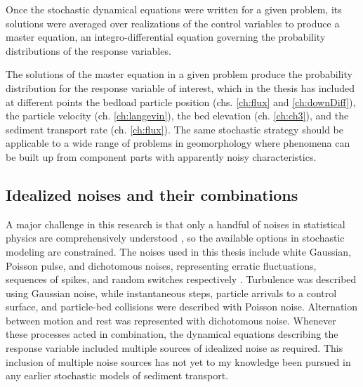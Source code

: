 Once the stochastic dynamical equations were written for a given problem, its solutions were averaged over realizations of the control variables to produce a master equation, an integro-differential equation governing the probability distributions of the response variables.

The solutions of the master equation in a given problem produce the probability distribution for the response variable of interest, which in the thesis has included at different points the bedload particle position (chs. \ref{ch:flux} and \ref{ch:downDiff}), the particle velocity (ch. \ref{ch:langevin}), the bed elevation (ch. \ref{ch:ch3}), and the sediment transport rate (ch. \ref{ch:flux}).
The same stochastic strategy should be applicable to a wide range of problems in geomorphology where phenomena can be built up from component parts with apparently noisy characteristics.


\subsection{Idealized noises and their combinations}

A major challenge in this research is that only a handful of noises in statistical physics are comprehensively understood \citep{Horsthemke1984}, so the available options in stochastic modeling are constrained.
The noises used in this thesis include white Gaussian, Poisson pulse, and dichotomous noises, representing erratic fluctuations, sequences of spikes, and random switches respectively \citep{VanDenBroeck1983}.
Turbulence was described using Gaussian noise, while instantaneous steps, particle arrivals to a control surface, and particle-bed collisions were described with Poisson noise. Alternation between motion and rest was represented with dichotomous noise.
Whenever these processes acted in combination, the dynamical equations describing the response variable included multiple sources of idealized noise as required.
This inclusion of multiple noise sources has not yet to my knowledge been pursued in any earlier stochastic models of sediment transport.

